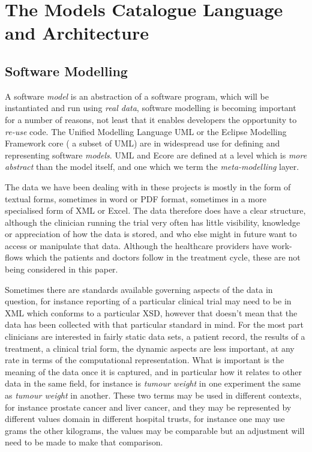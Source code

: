 \section{The Models Catalogue Language and Architecture}
 
\subsection{Software Modelling}
A software \emph{model} is an abstraction of a software program, which will be instantiated and run using \emph{real data}, software modelling is becoming important for a number of reasons, not least that it enables developers the opportunity to \emph{re-use} code. The Unified Modelling Language UML \cite{UML} or the Eclipse Modelling Framework core \cite{ECORE} ( a subset of UML) are in widespread use for defining and representing software \emph{models}. UML and Ecore are defined at a level which is \emph{more abstract} than the model itself, and one which we term the \emph{meta-modelling} layer. 

The data we have been dealing with in these projects is mostly in the form of textual forms, sometimes in word or PDF format, sometimes in a more specialised form of XML or Excel. The data therefore does have a clear structure, although the clinician running the trial very often has little visibility, knowledge or appreciation of how the data is stored, and who else might in future want to access or manipulate that data.  Although the healthcare providers have work-flows which the patients and doctors follow in the treatment cycle, these are not being considered in this paper.

Sometimes there are standards available governing aspects of the data in question, for instance reporting of a particular clinical trial may need to be in XML which conforms to a particular XSD, however that doesn't mean that the data has been collected with that particular standard in mind.  For the most part clinicians are interested in fairly static data sets, a patient record, the results of a treatment, a clinical trial form, the dynamic aspects are less important, at any rate in terms of the computational representation. What is important is the meaning of the data once it is captured, and in particular how it relates to other data in the same field, for instance is \emph{tumour weight} in one experiment the same as \emph{tumour weight} in another. These two terms may be used in different contexts, for instance prostate cancer and liver cancer, and they may be represented by different values domain in different hospital trusts, for instance one may use grams the other kilograms, the values may be comparable but an adjustment will need to be made to make that comparison.

